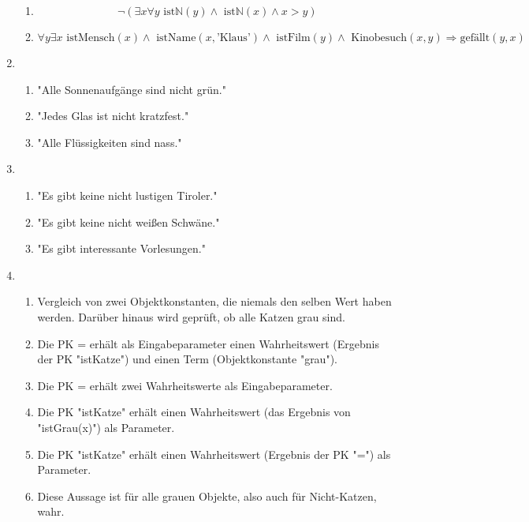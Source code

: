 \documentclass[a4paper]{article}
\begin{document}
\begin{enumerate}
\begin{enumerate}
			\item
			\begin{equation*}
				\lnot (\exists x \forall y \text{ ist}\mathbb{N}(y) \land \text{ ist}\mathbb{N}(x) \land x > y)
			\end{equation*}
			
			\item
			\begin{equation*}
				\forall y \exists x \text{ istMensch}(x) \land \text{ istName}(x, \text{'Klaus'}) \land \text{ istFilm}(y) \land \text{ Kinobesuch}(x, y) \Rightarrow \text{gefällt}(y, x)
			\end{equation*}
		\end{enumerate}
		
		\item
		\begin{enumerate}
			\item "Alle Sonnenaufgänge sind nicht grün."
			\item "Jedes Glas ist nicht kratzfest."
			\item "Alle Flüssigkeiten sind nass."
		\end{enumerate}
		
		\item
		\begin{enumerate}
			\item "Es gibt keine nicht lustigen Tiroler."
			\item "Es gibt keine nicht weißen Schwäne."
			\item "Es gibt interessante Vorlesungen."
		\end{enumerate}
		
		\item
		\begin{enumerate}
			\item Vergleich von zwei Objektkonstanten, die niemals den selben Wert haben werden. Darüber hinaus wird geprüft, ob alle Katzen grau sind.
			\item Die PK = erhält als Eingabeparameter einen Wahrheitswert (Ergebnis der PK "istKatze") und einen Term (Objektkonstante "grau").
			\item Die PK = erhält zwei Wahrheitswerte als Eingabeparameter.
			\item Die PK "istKatze" erhält einen Wahrheitswert (das Ergebnis von "istGrau(x)") als Parameter.
			\item Die PK "istKatze" erhält einen Wahrheitswert (Ergebnis der PK "=") als Parameter.
			\item Diese Aussage ist für alle grauen Objekte, also auch für Nicht-Katzen, wahr.
		\end{enumerate}
		

\end{enumerate}
\end{document}
